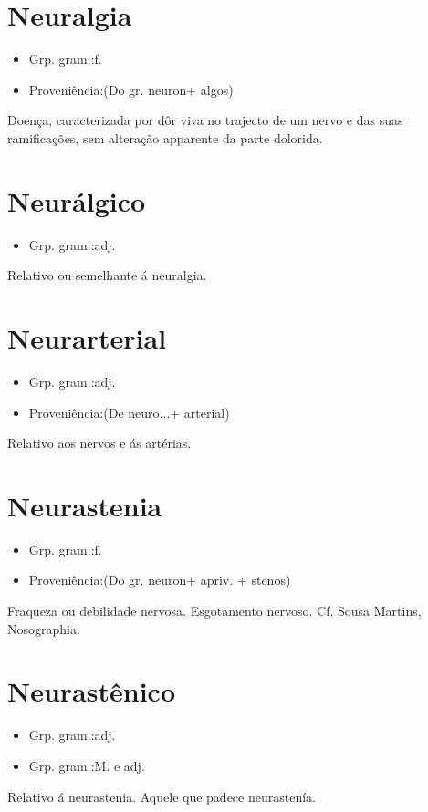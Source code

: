 \section{Neuralgia}
\begin{itemize}
\item {Grp. gram.:f.}
\end{itemize}
\begin{itemize}
\item {Proveniência:(Do gr. \textunderscore neuron\textunderscore  + \textunderscore algos\textunderscore )}
\end{itemize}
Doença, caracterizada por dôr viva no trajecto de um nervo e das suas ramificações, sem alteração apparente da parte dolorida.
\section{Neurálgico}
\begin{itemize}
\item {Grp. gram.:adj.}
\end{itemize}
Relativo ou semelhante á neuralgia.
\section{Neurarterial}
\begin{itemize}
\item {Grp. gram.:adj.}
\end{itemize}
\begin{itemize}
\item {Proveniência:(De \textunderscore neuro...\textunderscore  + \textunderscore arterial\textunderscore )}
\end{itemize}
Relativo aos nervos e ás artérias.
\section{Neurastenia}
\begin{itemize}
\item {Grp. gram.:f.}
\end{itemize}
\begin{itemize}
\item {Proveniência:(Do gr. \textunderscore neuron\textunderscore  + \textunderscore a\textunderscore  priv. + \textunderscore stenos\textunderscore )}
\end{itemize}
Fraqueza ou debilidade nervosa.
Esgotamento nervoso. Cf. Sousa Martins, \textunderscore Nosographia\textunderscore .
\section{Neurastênico}
\begin{itemize}
\item {Grp. gram.:adj.}
\end{itemize}
\begin{itemize}
\item {Grp. gram.:M.  e  adj.}
\end{itemize}
Relativo á neurastenia.
Aquele que padece neurastenía.

